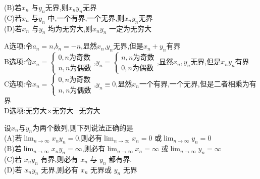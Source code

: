 \documentclass[8pt a4paper, oneside, UTF8]{ctexbook}
\begin{document}
\begin{sloppypar}
\begin{problem}
    (B)若$x_n$ 与${y_n}$无界,则{$x_ny_n$}无界\\
    (C)若${x_n}$ 与${y_n}$ 中,一个有界,一个无界,则{$x_ny_n$}无界\\
    (D)若$x_n$ 与$ y_n$ 均为无穷大,则$ x_ny_n$ 一定为无穷大
    \end{problem}
    \begin{solution}
        A选项:令$a_n=n$,$b_n=-n$,显然$x_n$,$y_n$无界,但是$x_n+y_n$有界\\
        B选项:令$x_n=\begin{cases}
                0, n\text{为奇数} \\
                n,n\text{为偶数}
            \end{cases}$,$y_n=\begin{cases}
                n,n\text{为奇数} \\
                0, n\text{为偶数}
            \end{cases}$,显然$x_n,y_n$无界,但是$x_n y_n$有界\\
        C选项:令$x_n=\begin{cases}
                0, n\text{为奇数} \\
                n,n\text{为偶数}
            \end{cases}$,$y_n \equiv 0$,显然$x_n$一个有界,一个无界,但是二者相乘为有界\\
        D选项:无穷大$\times$无穷大=无穷大
    \end{solution}
    \begin{problem}
    设$x_n$与${y_n}$为两个数列,则下列说法正确的是\\
    (A)若$\lim_{n\to\infty} x_ny_n=0$,则必有$\lim_{n\to\infty} x_n=0$ 或$\lim_{n\to\infty} y_n=0$\\
    (B)若$\lim_{n\to\infty} x_ny_n=\infty$,则必有$\lim_{n\to\infty} x_n=\infty$ 或$\lim_{n\to\infty}y_n=\infty$\\
    (C)若 $x_ny_n$ 有界,则必有 $x_n$ 与 $y_n$ 都有界.\\
    (D)若 $x_ny_n$ 无界,则必有 $x_n$ 无界或 $y_n$ 无界
    \end{problem}
\end{sloppypar}
\end{document}
